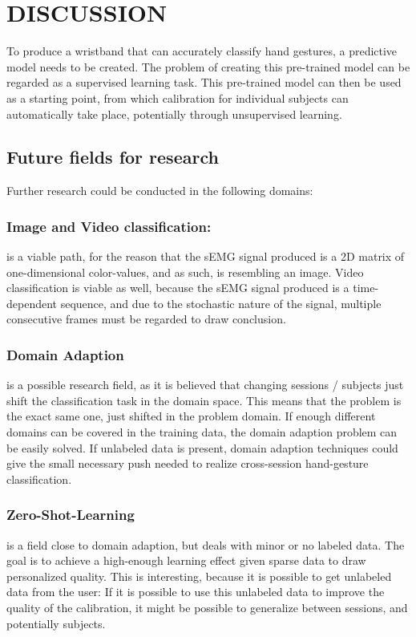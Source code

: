 \documentclass{article}
\begin{document}
\section{DISCUSSION}
To produce a wristband that can accurately classify hand gestures, a predictive model needs to be created. The problem of creating this pre-trained model can be regarded as a supervised learning task. This pre-trained model can then be used as a starting point, from which calibration for individual subjects can automatically take place, potentially through unsupervised learning.

\subsection{Future fields for research}
Further research could be conducted in the following domains:
\subsubsection{Image and Video classification: } is a viable path, for the reason that the sEMG signal produced is a 2D matrix of one-dimensional color-values, and as such, is resembling an image. Video classification is viable as well, because the sEMG signal produced is a time-dependent sequence, and due to the stochastic nature of the signal, multiple consecutive frames must be regarded to draw conclusion.
\subsubsection{Domain Adaption} is a possible research field, as it is believed that changing sessions / subjects just shift the classification task in the domain space. This means that the problem is the exact same one, just shifted in the problem domain. If enough different domains can be covered in the training data, the domain adaption problem can be easily solved. If unlabeled data is present, domain adaption techniques could give the small necessary push needed to realize cross-session hand-gesture classification.
\subsubsection{Zero-Shot-Learning} is a field close to domain adaption, but deals with minor or no labeled data. The goal is to achieve a high-enough learning effect given sparse data to draw personalized quality. This is interesting, because it is possible to get unlabeled data from the user: If it is possible to use this unlabeled data to improve the quality of the calibration, it might be possible to generalize between sessions, and potentially subjects.
\end{document}
